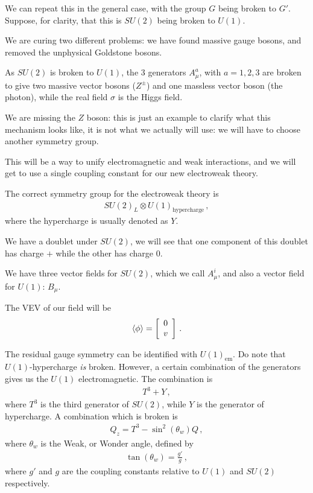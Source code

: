 \documentclass[main.tex]{subfiles}
\begin{document}

We can repeat this in the general case, with the group \(G\) being broken to \(G'\). Suppose, for clarity, that this is \(SU(2)\) being broken to \(U(1)\). 

We are curing two different problems: we have found massive gauge bosons, and removed the unphysical Goldstone bosons.

As \(SU(2)\) is broken to \(U(1)\), the 3 generators \(A_{\mu }^{a}\), with \(a = 1, 2, 3\) are broken to give two massive vector bosons (\(Z^{\pm}\)) and one massless vector boson (the photon), while the real field \(\sigma \) is the Higgs field.

We are missing the \(Z\) boson: this is just an example to clarify what this mechanism looks like, it is not what we actually will use: we will have to choose another symmetry group.

This will be a way to unify electromagnetic and weak interactions, and we will get to use a single coupling constant for our new electroweak theory.

The correct symmetry group for the electroweak theory is 
%
\begin{align}
SU(2)_{L} \otimes U(1) _{\text{hypercharge}}
\,,
\end{align}
%
where the hypercharge is usually denoted as \(Y\).

We have a doublet under \(SU(2)\), we will see that one component of this doublet has charge \(+\) while the other has charge 0.

We have three vector fields for \(SU(2)\), which we call \(A_{\mu}^{i}\), and also a vector field for \(U(1)\): \(B_{\mu }\).

The VEV of our field will be 
%
\begin{subequations}
\begin{align}
\expval{\phi }= \left[\begin{array}{c}
0 \\ 
v
\end{array}\right]
\,.
\end{align}
\end{subequations}

The residual gauge symmetry can be identified with \(U(1)_{\text{em}}\). Do note that \(U(1)\)-hypercharge \emph{is} broken. However, a certain combination of the generators gives us the \(U(1)\) electromagnetic.
The combination is 
%
\begin{align}
T^{3} + Y
\,,
\end{align}
%
where \(T^{3}\) is the third generator of \(SU(2)\), while \(Y\) is the generator of hypercharge. 
A combination which is broken is 
%
\begin{align}
Q_{z} = T^{3} - \sin^2 (\theta_{w}) Q
\,,
\end{align}
%
where \(\theta_{w}\) is the Weak, or Wonder angle, defined by 
%
\begin{align}
\tan(\theta_{w}) = \frac{g'}{g}
\,,
\end{align}
%
where \(g'\) and \(g\) are the coupling constants relative to \(U(1)\) and \(SU(2)\) respectively.
\end{document}
